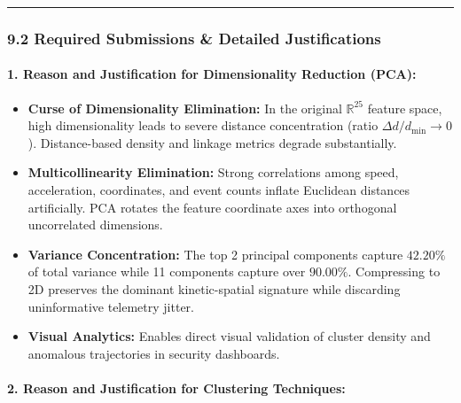 \documentclass[11pt]{article}
\providecommand{\tightlist}{%
      \setlength{\itemsep}{0pt}\setlength{\parskip}{0pt}}
\begin{document}
\begin{center}\rule{0.5\linewidth}{0.5pt}\end{center}

\subsubsection{9.2 Required Submissions \& Detailed
Justifications}\label{required-submissions-detailed-justifications}

\paragraph{1. Reason and Justification for Dimensionality Reduction
(PCA):}\label{reason-and-justification-for-dimensionality-reduction-pca}

\begin{itemize}
\tightlist
\item
  \textbf{Curse of Dimensionality Elimination:} In the original
  \(\mathbb{R}^{25}\) feature space, high dimensionality leads to severe
  distance concentration (ratio \(\Delta d / d_{\min} \to 0\)).
  Distance-based density and linkage metrics degrade substantially.
\item
  \textbf{Multicollinearity Elimination:} Strong correlations among
  speed, acceleration, coordinates, and event counts inflate Euclidean
  distances artificially. PCA rotates the feature coordinate axes into
  orthogonal uncorrelated dimensions.
\item
  \textbf{Variance Concentration:} The top 2 principal components
  capture \(42.20\%\) of total variance while 11 components capture over
  \(90.00\%\). Compressing to 2D preserves the dominant kinetic-spatial
  signature while discarding uninformative telemetry jitter.
\item
  \textbf{Visual Analytics:} Enables direct visual validation of cluster
  density and anomalous trajectories in security dashboards.
\end{itemize}

\paragraph{2. Reason and Justification for Clustering
Techniques:}\label{reason-and-justification-for-clustering-techniques}
\end{document}
